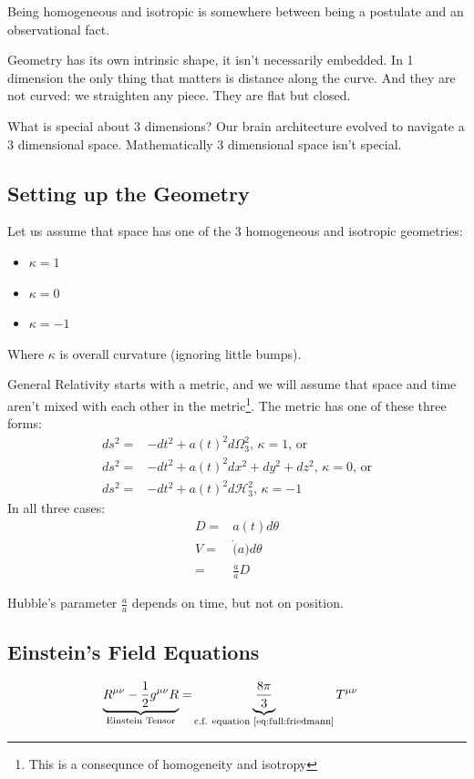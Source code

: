 \documentclass[]{article}
\begin{document}
Being homogeneous and isotropic is somewhere between being a postulate and an observational fact.

Geometry has its own intrinsic shape, it isn't necessarily embedded. In 1 dimension the only thing that matters is distance along the curve. And they are not curved: we straighten any piece. They are flat but closed.

What is special about 3 dimensions? Our brain architecture evolved to navigate a 3 dimensional space. Mathematically 3 dimensional space isn't special.

\subsection{Setting up the Geometry}


Let us assume that space has one of the 3 homogeneous and isotropic geometries:
\begin{itemize}
	\item $\kappa=1$
	\item $\kappa=0$
	\item $\kappa=-1$
\end{itemize}
Where $\kappa$ is overall curvature (ignoring little bumps).

General Relativity starts with a metric, and we will assume that space and time aren't mixed with each other in the metric\footnote{This is a consequnce of homogeneity and isotropy}. The metric has one of these three forms:
\begin{align*}
	ds^2 =& - dt^2 + a(t)^2 d\Omega_3^2 \text{, $\kappa=1$, or}\\
	ds^2 =& - dt^2 + a(t)^2 dx^2 + dy^2 +dz^2 \text{, $\kappa=0$, or}\\
	ds^2 =& - dt^2 + a(t)^2 d\mathcal{H}_3^2 \text{, $\kappa=-1$}	
\end{align*}
In all three cases:
\begin{align*}
	D =& a(t) d\theta\\
	V =&  \dot(a) d\theta\\
	=& \frac{\dot{a}}{a}D	
\end{align*}

Hubble's parameter $\frac{\dot{a}}{a}$ depends on time, but not on position.

\subsection{Einstein's Field Equations}

\begin{align*}
	\underbrace{	R^{\mu\nu} - \frac{1}{2}g^{\mu\nu}R}_\text{Einstein Tensor}=&\underbrace{\frac{8\pi}{3}}_\text{c.f. equation \eqref{eq:full:friedmann}} T^{\mu\nu}
\end{align*}
\end{document}
